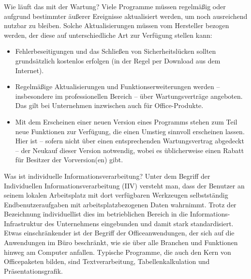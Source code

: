 \documentclass[a6paper,10pt,grid=front%
,toc
]{kartei}
\begin{document}
  \begin{karte}{Wie läuft das mit der Wartung?}  
    Viele Programme müssen regelmäßig oder aufgrund bestimmter äußerer Ereignisse aktualisiert werden, um noch ausreichend nutzbar zu bleiben. Solche Aktualisierungen müssen vom Hersteller bezogen werden, der diese auf unterschiedliche Art zur Verfügung stellen kann:


    \begin{itemize}
      \item Fehlerbeseitigungen und das Schließen von Sicherheitslücken sollten grundsätzlich kostenlos erfolgen (in der Regel per Download aus dem Internet).
      \item Regelmäßige Aktualisierungen und Funktionserweiterungen werden – insbesondere im professionellen Bereich – über Wartungsverträge angeboten. Das gilt bei Unternehmen inzwischen auch für Office-Produkte.
      \item Mit dem Erscheinen einer neuen Version eines Programms stehen zum Teil neue Funktionen zur Verfügung, die einen Umstieg sinnvoll erscheinen lassen. Hier ist – sofern nicht über einen entsprechenden Wartungsvertrag abgedeckt – der Neukauf dieser Version notwendig, wobei es üblicherweise einen Rabatt für Besitzer der Vorversion(en) gibt.
    \end{itemize}
  \end{karte}

  \begin{karte}{Was ist individuelle Informationsverarbeitung?}  
    Unter dem Begriff der Individuellen Informationsverarbeitung (IIV) versteht man, dass der Benutzer an seinem lokalen Arbeitsplatz mit dort verfügbaren Werkzeugen selbstständig Endbenutzeraufgaben mit arbeitsplatzbezogenen Daten wahrnimmt. Trotz der Bezeichnung \"individuell\" ist dies im betrieblichen Bereich in die Informations-Infrastruktur des Unternehmens eingebunden und damit stark standardisiert. Etwas einschränkender ist der Begriff der Officeanwendungen, der sich auf die Anwendungen im Büro beschränkt, wie sie über alle Branchen und Funktionen hinweg am Computer anfallen. Typische Programme, die auch den Kern von Officepaketen bilden, sind Textverarbeitung, Tabellenkalkulation und Präsentationsgrafik.
  \end{karte}
\end{document}
